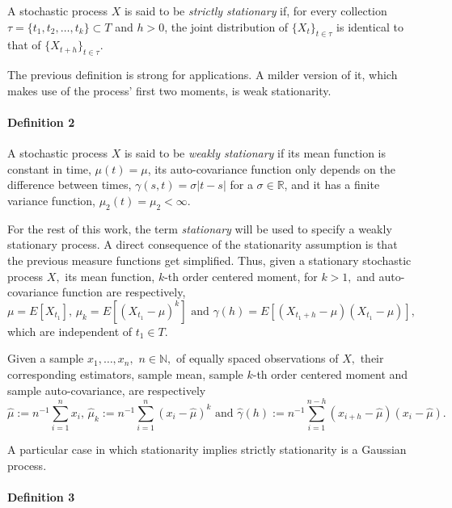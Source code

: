 A stochastic process \(X\) is said to be \emph{strictly stationary} if, for every collection \(\tau = \{t_1,t_2,\ldots, t_k\} \subset T\) and \(h > 0\), the joint distribution of \(\{X_t\}_{t \in \tau}\) is identical to that of \(\{X_{t+h}\}_{t \in \tau}.\)

The previous definition is strong for applications. A milder version of it, which makes use of the process' first two moments, is weak stationarity.

\hypertarget{definition-2}{%
\paragraph{Definition 2}\label{definition-2}}

A stochastic process \(X\) is said to be \emph{weakly stationary} if its mean function is constant in time, \(\mu(t) = \mu\), its auto-covariance function only depends on the difference between times, \(\gamma(s,t) = \sigma|t-s|\) for a \(\sigma\in \mathbb{R}\), and it has a finite variance function, \(\mu_2(t) = \mu_2 < \infty\).

For the rest of this work, the term \emph{stationary} will be used to specify a weakly stationary process. A direct consequence of the stationarity assumption is that the previous measure functions get simplified. Thus, given a stationary stochastic process \(X,\) its mean function, \(k\)-th order centered moment, for \(k>1,\) and auto-covariance function are respectively,
\[
 \mu = E[X_{t_1}]\mbox{, } \mu_k = E[(X_{t_1} -\mu)^k] \mbox{ and } \gamma(h) = E[(X_{t_1+h}-\mu)(X_{t_1}-\mu)],
\]
which are independent of \(t_1\in T.\)

Given a sample \(x_1, \ldots, x_n,\) \(n\in\mathbb{N},\) of equally spaced observations of \(X,\) their corresponding estimators, sample mean, sample \(k\)-th order centered moment and sample auto-covariance, are respectively
\[
 \widehat{\mu} := n^{-1}\sum_{i=1}^nx_i\mbox{, } \widehat{\mu}_k := n^{-1}\sum_{i=1}^n(x_i - \widehat{\mu})^k \mbox{ and }\widehat{\gamma}(h) := n^{-1}\sum_{i = 1}^{n-h}(x_{i+h} - \widehat{\mu})(x_i - \widehat{\mu}).
\]

A particular case in which stationarity implies strictly stationarity is a Gaussian process.

\hypertarget{definition-3}{%
\paragraph{Definition 3}\label{definition-3}}


